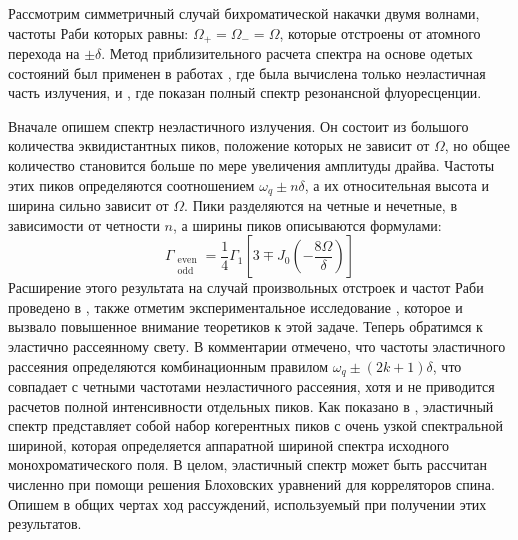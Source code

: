 Рассмотрим симметричный случай бихроматической накачки двумя волнами, частоты Раби которых равны: $\Omega_+=\Omega_-=\Omega$, которые отстроены от атомного перехода на $\pm \delta$. Метод приблизительного расчета спектра на основе одетых состояний был применен в работах \cite{Freedhoff_resonance}, где была вычислена только неэластичная часть излучения, и \cite{Agarwal:91}, где показан полный спектр резонансной флуоресценции. 

Вначале опишем спектр неэластичного излучения. Он состоит из большого количества эквидистантных пиков, положение которых не зависит от $\Omega$, но общее количество становится больше по мере увеличения амплитуды драйва. Частоты этих пиков определяются соотношением $\omega_q \pm n\delta$, а их  относительная высота и ширина сильно зависит от $\Omega$. Пики разделяются на четные и нечетные, в зависимости от четности $n$, а ширины пиков описываются формулами:
\begin{equation}
\Gamma_{{\substack{\text{even}\\ \text{odd} }}} = \frac{1}{4}\Gamma_1\left[3\mp J_0\left(-\frac{8\Omega}{\delta}\right)\right]
\end{equation}
Расширение этого результата на случай произвольных отстроек и частот Раби проведено в \cite{Ficek_resonance}, также отметим экспериментальное исследование \cite{Zhu_experiment}, которое и вызвало повышенное внимание 
теоретиков к этой задаче. 
Теперь обратимся к эластично рассеянному свету. В комментарии \cite{Comment_resonance} отмечено, что частоты эластичного рассеяния определяются комбинационным правилом $\omega_q \pm (2k+1)\delta$, что совпадает с четными частотами неэластичного рассеяния, хотя и не приводится расчетов полной интенсивности отдельных пиков.
Как показано в \cite{Agarwal:91}, эластичный спектр представляет собой набор  когерентных пиков с очень узкой спектральной шириной, которая определяется аппаратной шириной спектра исходного монохроматического поля. В целом, эластичный спектр может быть рассчитан численно при помощи решения Блоховских уравнений для корреляторов спина. Опишем в общих чертах ход рассуждений, используемый при получении этих результатов. 

